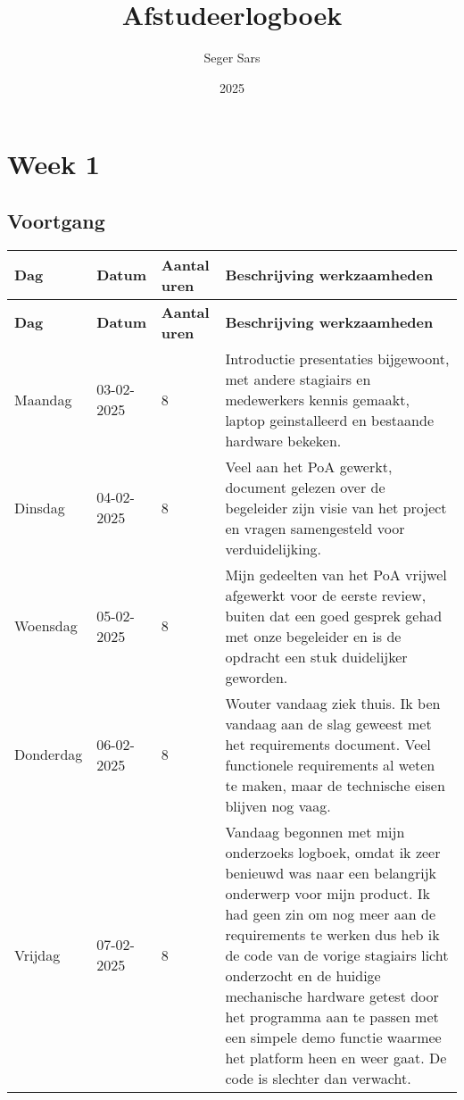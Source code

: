\documentclass[a4paper,12pt]{article}
\title{Afstudeerlogboek}
\author{Seger Sars}
\date{2025}
\begin{document}
\maketitle

\newpage

\section*{Week 1}

\subsection*{Voortgang}

\begin{longtable}{|l|l|p{}|p{}|}
\hline
\textbf{Dag} & \textbf{Datum} & \textbf{Aantal uren} & \textbf{Beschrijving werkzaamheden} \\
\hline
\endfirsthead
\hline
\textbf{Dag} & \textbf{Datum} & \textbf{Aantal uren} & \textbf{Beschrijving werkzaamheden} \\
\hline
\endhead
\hline
\endfoot
\endlastfoot
Maandag   & 03-02-2025 & 8 & Introductie presentaties bijgewoont, met andere stagiairs en medewerkers kennis gemaakt, laptop geinstalleerd en bestaande hardware bekeken. \\ \hline
Dinsdag   & 04-02-2025 & 8 & Veel aan het PoA gewerkt, document gelezen over de begeleider zijn visie van het project en vragen samengesteld voor verduidelijking. \\ \hline
Woensdag  & 05-02-2025 & 8 & Mijn gedeelten van het PoA vrijwel afgewerkt voor de eerste review, buiten dat een goed gesprek gehad met onze begeleider en is de opdracht een stuk duidelijker geworden. \\ \hline
Donderdag & 06-02-2025 & 8 & Wouter vandaag ziek thuis. Ik ben vandaag aan de slag geweest met het requirements document. Veel functionele requirements al weten te maken, maar de technische eisen blijven nog vaag. \\ \hline
Vrijdag   & 07-02-2025 & 8 & Vandaag begonnen met mijn onderzoeks logboek, omdat ik zeer benieuwd was naar een belangrijk onderwerp voor mijn product. Ik had geen zin om nog meer aan de requirements te werken dus heb ik de code van de vorige stagiairs licht onderzocht en de huidige mechanische hardware getest door het programma aan te passen met een simpele demo functie waarmee het platform heen en weer gaat. De code is slechter dan verwacht. \\ \hline

\hline

\end{longtable}
\end{document}
